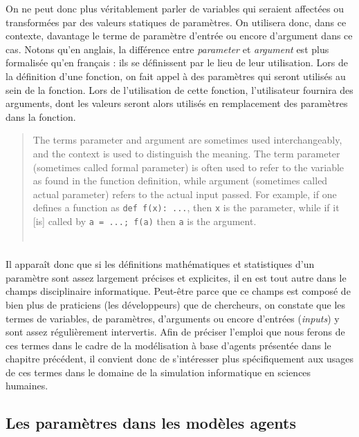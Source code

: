 On ne peut donc plus véritablement parler de variables qui seraient affectées ou transformées par des valeurs statiques de paramètres. On utilisera donc, dans ce contexte, davantage le terme de paramètre d'entrée ou encore d'argument dans ce cas. Notons qu'en anglais, la différence entre \textit{parameter} et \textit{argument} est plus formalisée qu'en français : ils se définissent par le lieu de leur utilisation. Lors de la définition d'une fonction, on fait appel à des paramètres qui seront utilisés au sein de la fonction. Lors de l'utilisation de cette fonction, l'utilisateur fournira des arguments, dont les valeurs seront alors utilisés en remplacement des paramètres dans la fonction.
\begin{quote}
	\og The terms parameter and argument are sometimes used interchangeably, and the context is used to distinguish the meaning. The term parameter (sometimes called formal parameter) is often used to refer to the variable as found in the function definition, while argument (sometimes called actual parameter) refers to the actual input passed. For example, if one defines a function as \texttt{def f(x): ...}, then \texttt{x} is the parameter, while if it [is] called by \texttt{a = ...; f(a)} then \texttt{a} is the argument.\fg{}\\
	\mbox{}~ \hfill \autocite{wiki_parameter2017} 
\end{quote}


\subsubsection*{} Il apparaît donc que si les définitions mathématiques et statistiques d'un paramètre sont assez largement précises et explicites, il en est tout autre dans le champs disciplinaire informatique. Peut-être parce que ce champs est composé de bien plus de praticiens (les développeurs) que de chercheurs, on constate que les termes de variables, de paramètres, d'arguments ou encore d'entrées (\textit{inputs}) y sont assez régulièrement intervertis. Afin de préciser l'emploi que nous ferons de ces termes dans le cadre de la modélisation à base d'agents présentée dans le chapitre précédent, il convient donc de s'intéresser plus spécifiquement aux usages de ces termes dans le domaine de la simulation informatique en sciences humaines.

\subsection{Les paramètres dans les modèles agents}

